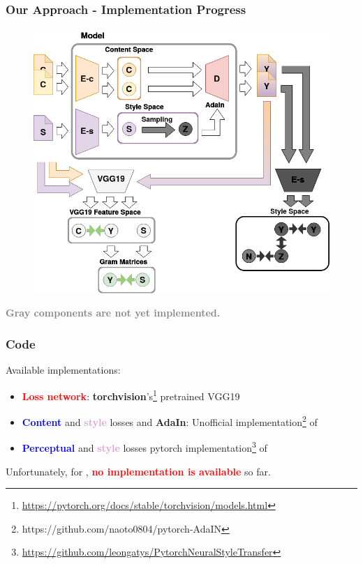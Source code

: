 \documentclass[11pt,xcolor=dvipsnames]{beamer}
\begin{document}
\begin{frame}
  \addtocounter{framenumber}{-1}
\frametitle{Our Approach - Implementation Progress}
\begin{figure}
\centering
\includegraphics[scale=0.3]{pipelinecurrent.png}


\end{figure}
\centering
\textcolor{gray}{\textbf{Gray components are not yet implemented.}}

\end{frame}

\begin{frame}
\frametitle{Code}

Available implementations:
	\vspace{10pt}

\begin{itemize}
	\item \textcolor{red}{\textbf{Loss network}}: \textbf{torchvision}'s\footnote{\url{https://pytorch.org/docs/stable/torchvision/models.html}} pretrained VGG19
	\vspace{10pt}
	\item \textcolor{blue}{\textbf{Content}} and \textcolor{Plum}{\textbf{style}} losses and \textbf{AdaIn}: Unofficial implementation\footnote{https://github.com/naoto0804/pytorch-AdaIN} of \cite{adain}
	\vspace{10pt}
	\item \textcolor{blue}{\textbf{Perceptual}} and \textcolor{Plum}{\textbf{style}} losses pytorch implementation\footnote{\url{https://github.com/leongatys/PytorchNeuralStyleTransfer}} of \cite{gatys}
\end{itemize}
	\vspace{10pt}

Unfortunately, for \cite{disentanglement}, \textbf{\textcolor{red}{no implementation is available}} so far.


\end{frame}
\end{document}
